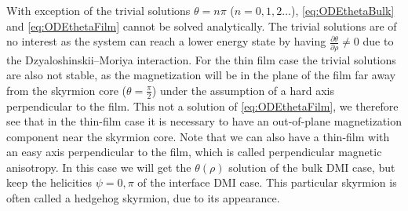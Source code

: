 \documentclass[12pt, a4paper]{article}		%
\numberwithin{equation}{section}
\begin{document}
With exception of the trivial solutions $\theta = n\pi$ ($n = 0, 1, 2 \ldots$), \eqref{eq:ODEthetaBulk} and \eqref{eq:ODEthetaFilm} cannot be solved analytically. The trivial solutions are of no interest as the system can reach a lower energy state by having $\frac{\partial\theta}{\partial\rho}\neq 0$ due to the Dzyaloshinskii--Moriya interaction. For the thin film case the trivial solutions are also not stable, as the magnetization will be in the plane of the film far away from the skyrmion core ($\theta=\frac{\pi}{2}$) under the assumption of a hard axis perpendicular to the film. This not a solution of \eqref{eq:ODEthetaFilm}, we therefore see that in the thin-film case it is necessary to have an out-of-plane magnetization component near the skyrmion core. Note that we can also have a thin-film with an easy axis perpendicular to the film, which is called perpendicular magnetic anisotropy. In this case we will get the $\theta(\rho)$ solution of the bulk DMI case, but keep the helicities $\psi = 0, \pi$ of the interface DMI case. This particular skyrmion is often called a hedgehog skyrmion, due to its appearance.
\end{document}
